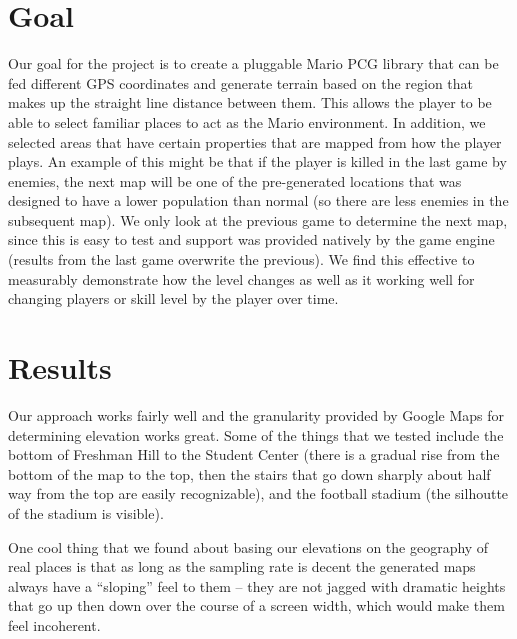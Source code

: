 \documentclass[12pt]{article}
\begin{document}
\section{Goal}
Our goal for the project is to create a pluggable Mario PCG library that can be fed different GPS coordinates and generate terrain based on the region that makes up the straight line distance between them.  This allows the player to be able to select familiar places to act as the Mario environment.  In addition, we selected areas that have certain properties that are mapped from how the player plays.  An example of this might be that if the player is killed in the last game by enemies, the next map will be one of the pre-generated locations that was designed to have a lower population than normal (so there are less enemies in the subsequent map).  We only look at the previous game to determine the next map, since this is easy to test and support was provided natively by the game engine (results from the last game overwrite the previous).  We find this effective to measurably demonstrate how the level changes as well as it working well for changing players or skill level by the player over time.

\section{Results}
Our approach works fairly well and the granularity provided by Google Maps for determining elevation works great.  Some of the things that we tested include the bottom of Freshman Hill to the Student Center (there is a gradual rise from the bottom of the map to the top, then the stairs that go down sharply about half way from the top are easily recognizable), and the football stadium (the silhoutte of the stadium is visible).

One cool thing that we found about basing our elevations on the geography of real places is that as long as the sampling rate is decent the generated maps always have a ``sloping'' feel to them -- they are not jagged with dramatic heights that go up then down over the course of a screen width, which would make them feel incoherent.
\end{document}
